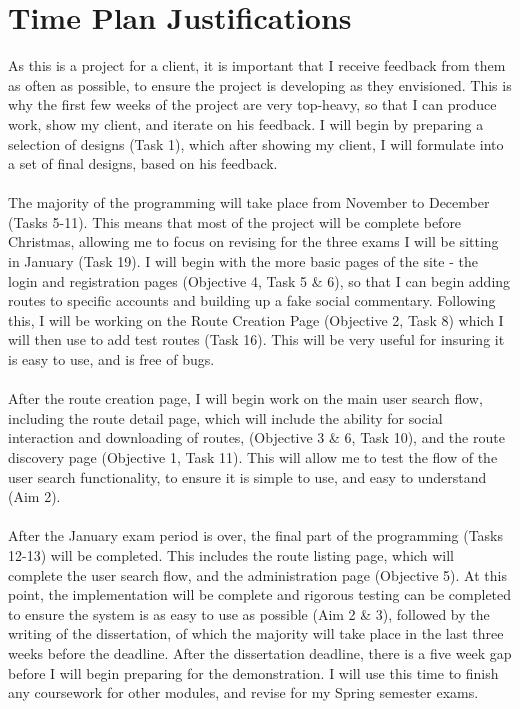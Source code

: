 \documentclass[a4paper,twoside,notitlepage,11pt]{article}
\begin{document}
\section{Time Plan Justifications}
As this is a project for a client, it is important that I receive feedback from them as often as possible, to ensure the project is developing as they envisioned. This is why the first few weeks of the project are very top-heavy, so that I can produce work, show my client, and iterate on his feedback. I will begin by preparing a selection of designs (Task 1), which after showing my client, I will formulate into a set of final designs, based on his feedback. 
\ \\
\ \\
The majority of the programming will take place from November to December (Tasks 5-11). This means that most of the project will be complete before Christmas, allowing me to focus on revising for the three exams I will be sitting in January (Task 19). I will begin with the more basic pages of the site - the login and registration pages (Objective 4, Task 5 \& 6), so that I can begin adding routes to specific accounts and building up a fake social commentary. Following this, I will be working on the Route Creation Page (Objective 2, Task 8) which I will then use to add test routes (Task 16). This will be very useful for insuring it is easy to use, and is free of bugs. 
\ \\
\ \\
After the route creation page, I will begin work on the main user search flow, including the route detail page, which will include the ability for social interaction and downloading of routes, (Objective 3 \& 6, Task 10), and the route discovery page (Objective 1, Task 11). This will allow me to test the flow of the user search functionality, to ensure it is simple to use, and easy to understand (Aim 2).
\ \\
\ \\
After the January exam period is over, the final part of the programming (Tasks 12-13) will be completed. This includes the route listing page, which will complete the user search flow, and the administration page (Objective 5). At this point, the implementation will be complete and rigorous testing can be completed to ensure the system is as easy to use as possible (Aim 2 \& 3), followed by the writing of the dissertation, of which the majority will take place in the last three weeks before the deadline. After the dissertation deadline, there is a five week gap before I will begin preparing for the demonstration. I will use this time to finish any coursework for other modules, and revise for my Spring semester exams.
\end{document}

